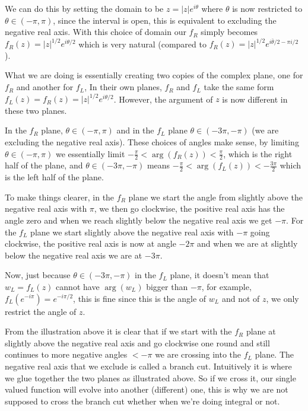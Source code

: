 \documentclass[aps,preprint,preprintnumbers,nofootinbib,showpacs,prd]{revtex4-1}
\begin{document}
We can do this by setting the domain to be $z = |z|e^{i\theta}$ where $\theta$ is now restricted to $\theta \in (-\pi,\pi)$, since the interval is open, this is equivalent to excluding the negative real axis. With this choice of domain our $f_R$ simply becomes $f_R(z) = |z|^{1/2} e^{i\theta/2}$ which is very natural (compared to $f_R(z) = |z|^{1/2} e^{i\bar\theta/2 -\pi i/2}$).

What we are doing is essentially creating two copies of the complex plane, one for $f_R$ and another for $f_L$, In their own planes, $f_R$ and $f_L$ take the same form $f_L(z) = f_R(z) = |z|^{1/2} e^{i\theta/2}$. However, the argument of $z$ is now different in these two planes.

In the $f_R$ plane, $\theta \in (-\pi, \pi)$ and in the $f_L$ plane $\theta \in (-3\pi, -\pi)$ (we are excluding the negative real axis). These choices of angles make sense, by limiting $\theta \in (-\pi, \pi)$ we essentially limit $ -\frac{\pi}{2} < \arg(f_R(z)) < \frac{\pi}{2}$, which is the right half of the plane, and $\theta \in (-3\pi, -\pi)$ means $ -\frac{\pi}{2} < \arg(f_L(z)) < -\frac{3\pi}{2}$ which is the left half of the plane.

To make things clearer, in the $f_R$ plane we start the angle from slightly above the negative real axis with $\pi$, we then go clockwise, the positive real axis has the angle zero and when we reach slightly below the negative real axis we get $-\pi$. For the $f_L$ plane we start slightly above the negative real axis with $-\pi$ going clockwise, the positive real axis is now at angle $-2\pi$ and when we are at slightly below the negative real axis we are at $-3\pi$.

Now, just because $\theta \in (-3\pi, -\pi)$ in the $f_L$ plane, it doesn't mean that $w_L = f_L(z)$ cannot have $\arg(w_L)$ bigger than $-\pi$, for example, $f_L(e^{-i\pi}) = e^{-i\pi/2}$, this is fine since this is the angle of $w_L$ and not of $z$, we only restrict the angle of $z$.

From the illustration above it is clear that if we start with the $f_R$ plane at slightly above the negative real axis and go clockwise one round and still continues to more negative angles $< -\pi$ we are crossing into the $f_L$ plane. The negative real axis that we exclude is called a branch cut. Intuitively it is where we glue together the two planes as illustrated above. So if we cross it, our single valued function will evolve into another (different) one, this is why we are not supposed to cross the branch cut whether when we're doing integral or not.
\end{document}
